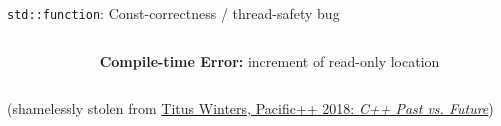 \begin{frame}[fragile]{\texttt{std::function}: Const-correctness / thread-safety bug}
    \begin{columns}[T]
        \begin{column}{.45\textwidth}
        \end{column}
        \begin{column}{.45\textwidth}
            \textbf{Compile-time Error:} increment of read-only location
        \end{column}
    \end{columns} 

    \begin{center}
        (\footnotesize shamelessly stolen from \href{https://youtu.be/IY8tHh2LSX4}{Titus Winters, Pacific++ 2018: \textit{C++ Past vs. Future}})
    \end{center}
\end{frame}

